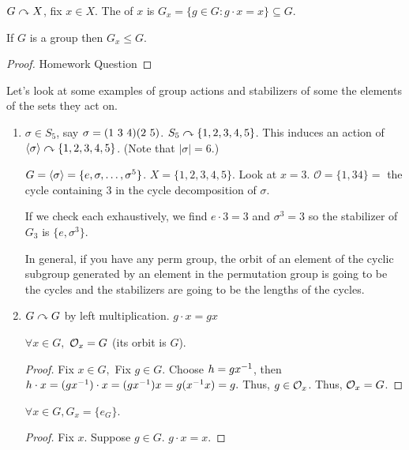 \documentclass[notes.tex]{subfiles}
\begin{document}

\begin{defn}
	$G\curvearrowright X$, fix $x\in X$. The  of $x$ is $G_x = \{g\in G: g\cdot x = x\}\subseteq G$.
\end{defn}

\begin{proposition}
	If $G$ is a group then $G_x \le G$.
\end{proposition}

\begin{proof}
	Homework Question
\end{proof}


\begin{eg} Let's look at some examples of group actions and stabilizers of some the elements of the sets they act on.
	\begin{enumerate}
		\item 
			$\sigma \in S_5$, say $\sigma = \text{(1 3 4)}\text{(2 5)}$.
			$S_5\curvearrowright\{1,2,3,4,5\}$.
			This induces an action of $\left\langle{\sigma}\right\rangle\curvearrowright \{1,2,3,4,5\}$. (Note that $|\sigma| = 6.$)

			$G = \left\langle{\sigma}\right\rangle = \{e, \sigma, \ldots, \sigma^5\}$.
			$X = \{1,2,3,4,5\}$.
			Look at $x=3$.
			$\mathcal{O} = \{1,3 4\} = $ the cycle containing $3$ in the cycle decomposition of $\sigma$.

			If we check each exhaustively, we find $e\cdot 3 = 3$ and $\sigma^3 = 3$ so the stabilizer of $G_3$ is $\{e, \sigma^3\}$. 
			
			In general, if you have any perm group, the orbit of an element of the cyclic subgroup generated by an element in the permutation group is going to be the cycles and the stabilizers are going to be the lengths of the cycles. 
		\item
			$G\curvearrowright G$ by left multiplication.
			$g\cdot x = gx$
			\begin{claim}
				$\forall x\in G, $ $\mathcal{O}_x = G$ (its orbit is $G$).
			\end{claim}
			\begin{proof}
				Fix $x\in G,$ Fix $g\in G$. Choose $h = g{x}^{-1}$, then $h\cdot x = (g{x}^{-1})\cdot x = (g{x}^{-1})x = g({x}^{-1}x) =g.$ Thus, $g\in \mathcal{O}_x$. Thus, $\mathcal{O}_x = G$.
			\end{proof}
			\begin{claim}
				$\forall x\in G, G_x = \{e_G\}$.
			\end{claim}
			\begin{proof}
				Fix $x$. Suppose $g\in G$.
				$g\cdot x = x$. 


\end{proof}
\end{enumerate}
\end{eg}
\end{document}
